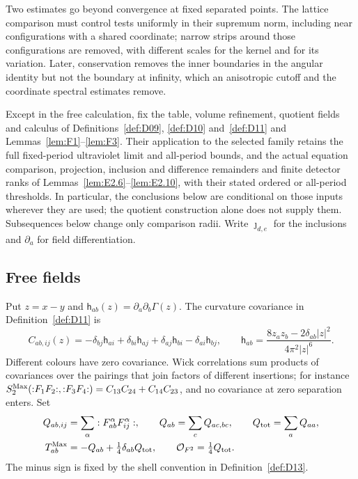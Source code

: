Two estimates go beyond convergence at fixed separated points. The lattice comparison must control tests uniformly in their supremum norm, including near configurations with a shared coordinate; narrow strips around those configurations are removed, with different scales for the kernel and for its variation. Later, conservation removes the inner boundaries in the angular identity but not the boundary at infinity, which an anisotropic cutoff and the coordinate spectral estimates remove.

Except in the free calculation, fix the table, volume refinement, quotient fields and calculus of Definitions~\ref{def:D09}, \ref{def:D10} and~\ref{def:D11} and Lemmas~\ref{lem:F1}--\ref{lem:F3}. Their application to the selected family retains the full fixed-period ultraviolet limit and all-period bounds, and the actual equation comparison, projection, inclusion and difference remainders and finite detector ranks of Lemmas~\ref{lem:E2.6}--\ref{lem:E2.10}, with their stated ordered or all-period thresholds. In particular, the conclusions below are conditional on those inputs wherever they are used; the quotient construction alone does not supply them. Subsequences below change only comparison radii. Write $\jmath_{d,e}$ for the inclusions and $\partial_a$ for field differentiation.

\subsection{Free fields}\label{sec:partII-G.1}

Put $z=x-y$ and $\mathsf h_{ab}(z)=\partial_a\partial_b\Gamma(z)$. The curvature covariance in Definition~\ref{def:D11} is
\begin{equation}\label{eq:G-curvature}
C_{ab,ij}(z)=-\delta_{bj}\mathsf h_{ai}+\delta_{bi}\mathsf h_{aj}
 +\delta_{aj}\mathsf h_{bi}-\delta_{ai}\mathsf h_{bj},\qquad
\mathsf h_{ab}=\frac{8z_az_b-2\delta_{ab}|z|^2}{4\pi^2|z|^6}.
\end{equation}
Different colours have zero covariance. Wick correlations sum products of covariances over the pairings that join factors of different insertions; for instance $S^{\mathrm{Max}}_2({:}F_1F_2{:},{:}F_3F_4{:})=C_{13}C_{24}+C_{14}C_{23}$, and no covariance at zero separation enters. Set
\begin{equation}\label{eq:G-free-tensor}
\begin{aligned}
Q_{ab,ij}&=\sum_\alpha:F_{ab}^\alpha F_{ij}^\alpha:,
\qquad Q_{ab}=\sum_cQ_{ac,bc},\qquad Q_{\rm tot}=\sum_aQ_{aa},\\
T^{\mathrm{Max}}_{ab}&=-Q_{ab}+\tfrac14\delta_{ab}Q_{\rm tot},
\qquad \mathcal{O}_{F^2}=\tfrac14Q_{\rm tot}.
\end{aligned}
\end{equation}
The minus sign is fixed by the shell convention in Definition~\ref{def:D13}.

